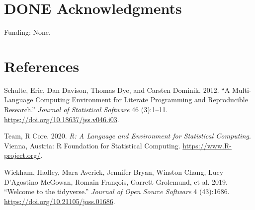 \documentclass[review]{elsarticle}
\begin{document}
\section*{{\bfseries\sffamily DONE} Acknowledgments}
\label{sec:org253324b}
Funding: None.
\section*{References}
\label{sec:org0e3e49e}
\begin{hangparas}{1.5em}{1}
\hypertarget{citeproc_bib_item_1}{Schulte, Eric, Dan Davison, Thomas Dye, and Carsten Dominik. 2012. “A Multi-Language Computing Environment for Literate Programming and Reproducible Research.” \textit{Journal of Statistical Software} 46 (3):1–11. \href{https://doi.org/10.18637/jss.v046.i03}{https://doi.org/10.18637/jss.v046.i03}.}

\hypertarget{citeproc_bib_item_2}{Team, R Core. 2020. \textit{R: A Language and Environment for Statistical Computing}. Vienna, Austria: R Foundation for Statistical Computing. \href{https://www.R-project.org/}{https://www.R-project.org/}.}

\hypertarget{citeproc_bib_item_3}{Wickham, Hadley, Mara Averick, Jennifer Bryan, Winston Chang, Lucy D’Agostino McGowan, Romain François, Garrett Grolemund, et al. 2019. “Welcome to the tidyverse.” \textit{Journal of Open Source Software} 4 (43):1686. \href{https://doi.org/10.21105/joss.01686}{https://doi.org/10.21105/joss.01686}.}
\end{hangparas}
\end{document}
